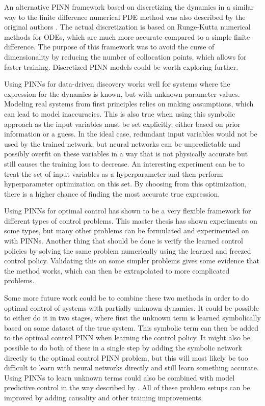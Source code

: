 An alternative PINN framework based on discretizing the dynamics in a similar way to the finite difference numerical PDE method was also described by the original authors \cite{pinn1}. The actual discretization is based on Runge-Kutta numerical methods for ODEs, which are much more accurate compared to a simple finite difference. The purpose of this framework was to avoid the curse of dimensionality by reducing the number of collocation points, which allows for faster training. Discretized PINN models could be worth exploring further.

Using PINNs for data-driven discovery works well for systems where the expression for the dynamics is known, but with unknown parameter values. Modeling real systems from first principles relies on making assumptions, which can lead to model inaccuracies. This is also true when using this symbolic approach as the input variables must be set explicitly, either based on prior information or a guess. In the ideal case, redundant input variables would not be used by the trained network, but neural networks can be unpredictable and possibly overfit on these variables in a way that is not physically accurate but still causes the training loss to decrease. An interesting experiment can be to treat the set of input variables as a hyperparameter and then perform hyperparameter optimization on this set. By choosing from this optimization, there is a higher chance of finding the most accurate true expression.

Using PINNs for optimal control has shown to be a very flexible framework for different types of control problems. This master thesis has shown experiments on some types, but many other problems can be formulated and experimented on with PINNs. Another thing that should be done is verify the learned control policies by solving the same problem numerically using the learned and freezed control policy. Validating this on some simpler problems gives some evidence that the method works, which can then be extrapolated to more complicated problems.

Some more future work could be to combine these two methods in order to do optimal control of systems with partially unknown dynamics. It could be possible to either do it in two stages, where first the unknown term is learned symbolically based on some dataset of the true system. This symbolic term can then be added to the optimal control PINN when learning the control policy. It might also be possible to do both of these in a single step by adding the symbolic network directly to the optimal control PINN problem, but this will most likely be too difficult to learn with neural networks directly and still learn something accurate. Using PINNs to learn unknown terms could also be combined with model predictive control in the way described by \cite{pinncontroldynamical}. All of these problem setups can be improved by adding causality and other training improvements.